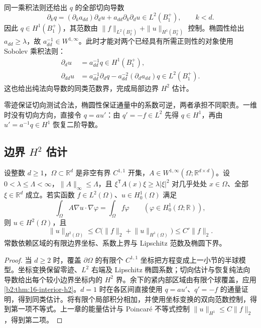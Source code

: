 同一乘积法则还给出 \(q\) 的全部切向导数
\[\partial_kq=(\partial_ka_{dd})\partial_du+a_{dd}\partial_k\partial_du
 \in L^2(B_1^+),\qquad k<d.\]
因此 \(q\in H^1(B_1^+)\)，其范数由 \(\|f\|_{L^2(B_2^+)}+\|u\|_{H^1(B_2^+)}\) 控制。椭圆性给出 \(a_{dd}\geq\lambda\)，故 \(a_{dd}^{-1}\in W^{1,\infty}\)。此时才能对两个已经具有所需正则性的对象使用 Sobolev 乘积法则：
\[
 \begin{aligned}
 \partial_du&=a_{dd}^{-1}q\in H^1(B_1^+),\\
 \partial_{dd}u&=a_{dd}^{-1}\partial_dq
       -a_{dd}^{-2}(\partial_da_{dd})q\in L^2(B_1^+).
 \end{aligned}
\]
这也给出纯法向导数的同类范数界，完成局部边界 \(H^2\) 估计。

\ProseParagraphBreak

零迹保证切向测试合法，椭圆性保证通量中的系数可逆，两者承担不同职责。一维时没有切向方向，直接令 \(q=au'\)：由 \(q'=-f\in L^2\) 先得 \(q\in H^1\)，再由 \(u'=a^{-1}q\in H^1\) 恢复二阶导数。

\subsection{边界 \texorpdfstring{\(H^2\)}{H2} 估计}
\label{b2:subsec:160303}

\begin{theorem}
\label{b2:thm:16-boundary-h2}
设整数 \(d\geq1\)，\(\Omega\subset\mathbb R^d\) 是非空有界 \(C^{1,1}\) 开集，\(A\in W^{1,\infty}(\Omega;\mathbb R^{d\times d})\)。设 \(0<\lambda\leq\Lambda<\infty\)，\(\|A\|_\infty\leq\Lambda\)，且 \(\xi^{\mathsf T}A(x)\xi\geq\lambda|\xi|^2\) 对几乎处处 \(x\in\Omega\)、全部 \(\xi\in\mathbb R^d\) 成立。若实函数 \(f\in L^2(\Omega)\)、\(u\in H_0^1(\Omega)\) 满足
\[\int_\Omega A\nabla u\cdot\nabla\varphi
 =\int_\Omega f\varphi\qquad(\varphi\in H_0^1(\Omega;\mathbb R)),\]
则 \(u\in H^2(\Omega)\)，且
\[\lVert u\rVert_{H^2(\Omega)}\le C\bigl(\lVert f\rVert_2+\lVert u\rVert_{H^1(\Omega)}\bigr)\le C'\lVert f\rVert_2.\]
常数依赖区域的有限边界坐标、系数上界与 Lipschitz 范数及椭圆下界。
\end{theorem}
\begin{proof}
当 \(d\geq2\) 时，覆盖 \(\partial\Omega\) 的有限个 \(C^{1,1}\) 坐标把方程变成上一小节的半球模型。坐标变换保留零迹、\(L^2\) 右端及 Lipschitz 椭圆系数；切向估计与恢复纯法向导数给出每个较小边界坐标内的 \(H^2\) 界。余下的紧内部区域由有限个球覆盖，应用\cref{b2:thm:16-interior-h2}。\(d=1\) 时在各区间直接使用 \(q=au'\)、\(q'=-f\) 的通量证明，得到同类估计。将有限个局部积分相加，并使用坐标变换的双向范数控制，得到第一项不等式。上一章的能量估计与 Poincaré 不等式控制 \(\lVert u\rVert_{H^1}\le C\lVert f\rVert_2\)，得到第二项。
\end{proof}

